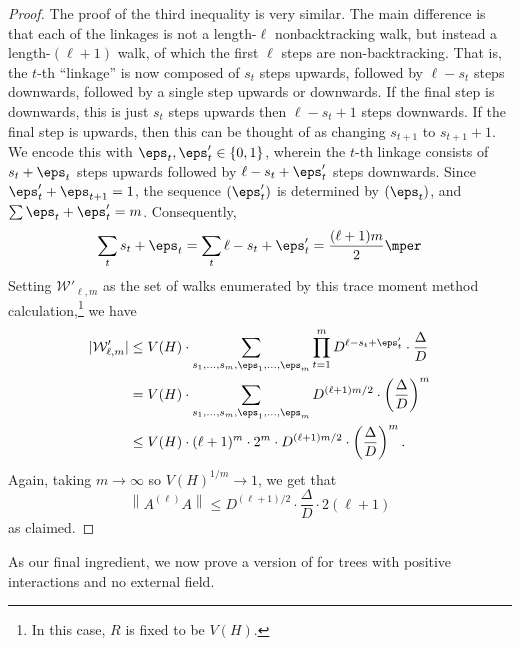 \documentclass[11pt,letterpaper]{article}
\begin{document}
\begin{proof}
        The proof of the third inequality is very similar.
        The main difference is that each of the linkages is not a length-$\ell$ nonbacktracking walk, but instead a length-$(\ell+1)$ walk, of which the first $\ell$ steps are non-backtracking. That is, the $t$-th ``linkage'' is now composed of $s_t$ steps upwards, followed by $\ell-s_t$ steps downwards, followed by a single step upwards or downwards.
        If the final step is downwards, this is just $s_t$ steps upwards then $\ell - s_t + 1$ steps downwards. 
        If the final step is upwards, then this can be thought of as changing $s_{t+1}$ to $s_{t+1} + 1$.
        We encode this with $\eps_t, \eps'_t \in \{0,1\}$, wherein the $t$-th linkage consists of $s_t + \eps_t$ steps upwards followed by $\ell - s_t + \eps'_t$ steps downwards. Since $\eps'_t+\eps_{t+1}=1$, the sequence $(\eps'_t)$ is determined by $(\eps_t)$, and $\sum \eps_t + \eps'_t = m$. Consequently,
        \[
            \sum_{t} s_t + \eps_t = \sum_{t} \ell - s_t + \eps'_t = \frac{(\ell+1)m}{2}\mper
        \]
        Setting $\mathcal{W}'_{\ell,m}$ as the set of walks enumerated by this trace moment method calculation,\footnote{In this case, $R$ is fixed to be $V(H)$.} we have
        \begin{align*}
            |\mathcal{W}'_{\ell,m}| &\le V(H) \cdot \sum_{s_1,\ldots,s_m,\eps_1,\ldots,\eps_m} \prod_{t=1}^{m} D^{\ell - s_t + \eps'_t} \cdot \frac{\Delta}{D} \\
                &= V(H) \cdot \sum_{s_1,\ldots,s_m,\eps_1,\ldots,\eps_m} D^{(\ell+1)m/2} \cdot \left(\frac{\Delta}{D}\right)^m \\
                &\le V(H) \cdot (\ell+1)^m \cdot 2^m \cdot D^{(\ell+1)m/2} \cdot \left( \frac{\Delta}{D} \right)^m.
        \end{align*}
        Again, taking $m\to\infty$ so $V(H)^{1/m} \to 1$, we get that 
        \[ \left\| A^{(\ell)} A \right\| \le D^{(\ell+1)/2} \cdot \frac{\Delta}{D} \cdot 2 (\ell+1) \]
        as claimed.
    \end{proof}

    As our final ingredient, we now prove a version of  for trees with positive interactions and no external field.
\end{document}
